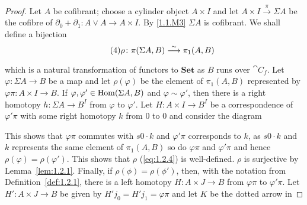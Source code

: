 \documentclass[../main]{subfiles}
\begin{document}
\begin{proof}
    Let $A$ be cofibrant; choose a cylinder object $A \times I$ and let $A \times I \overset{\pi}{\longrightarrow} \Sigma A$ be the cofibre of $\partial_0 + \partial_1 \colon A \vee A \longrightarrow A \times I$. By \ref{1.1.M3} $\Sigma A$ is cofibrant. We shall define a bijection
    \[\tag{4}\label{eq:1.2.4}
    \rho \colon \pi(\Sigma A,B) \varrightarrow{\sim} \pi_1(A,B) 
    \]
    which is a natural transformation of functors to $\mathbf{Set}$ as $B$ runs over $\cat{C}_f$. Let $\varphi \colon \Sigma A \longrightarrow B$ be a map and let $\rho(\varphi)$ be the element of $\pi_1(A,B)$ represented by $\varphi \pi \colon A \times I \longrightarrow B$. If $\varphi, \varphi' \in \operatorname{Hom}(\Sigma A,B)$ and $\varphi \sim \varphi'$, then there is a right homotopy $h \colon \Sigma A \longrightarrow B^I$ from $\varphi$ to $\varphi'$. Let $H \colon A \times I \longrightarrow B^I$ be a correspondence of $\varphi'\pi$ with some right homotopy $k$ from $0$ to $0$ and consider the diagram 
    \begin{center}
\end{center}
    This shows that $\varphi \pi$ commutes with $s0 \cdot k$ and $\varphi' \pi$ corresponds to $k$, as $s0 \cdot k$ and $k$ represents the same element of $\pi_1(A,B)$ so do $\varphi \pi$ and $\varphi' \pi$ and hence $\rho(\varphi) = \rho(\varphi')$. This shows that $\rho$ (\ref{eq:1.2.4}) is well-defined. $\rho$ is surjective by Lemma~\ref{lem:1.2.1}. Finally, if $\rho(\phi) = \rho(\phi')$, then, with the notation from Definition~\ref{def:1.2.1}, there is a left homotopy $H \colon A \times J \longrightarrow B$ from $\varphi \pi$ to $\varphi' \pi$. Let $H' \colon A \times J \longrightarrow B$ be given by $H'j_0 = H'j_1 = \varphi\pi$ and let $K$ be the dotted arrow in 

\end{proof}
\end{document}
